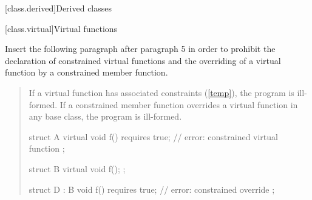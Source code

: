 
\setcounter{chapter}{9}
[class.derived]{Derived classes}

\setcounter{section}{2}
[class.virtual]{Virtual functions}

Insert the following paragraph after paragraph 5 in order to
prohibit the declaration of constrained virtual functions and
the overriding of a virtual function by a constrained member
function.

\begin{quote}
\begin{addedblock}
\setcounter{Paras}{5}

\pnum
If a virtual function has associated constraints 
(\ref{temp}), the program is ill-formed. If
a constrained member function overrides a virtual function in any
base class, the program is ill-formed.
%
\enterexample
\begin{codeblock}
struct A {
  virtual void f() requires true; // error: constrained virtual function
};

struct B {
  virtual void f();
};

struct D : B {
  void f() requires true; // error: constrained override
};
\end{codeblock}
\exitexample
\end{addedblock}
\end{quote}

